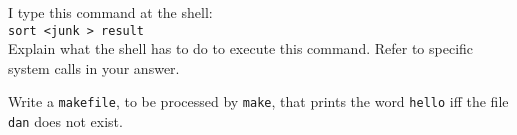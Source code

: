 

I type this command at the shell: \\
\verb|sort <junk > result| \\
Explain what the shell has to do to execute this command. Refer to specific system calls in your answer.

\vfill


Write a \verb|makefile|, to be processed by \verb|make|, that prints the word \verb|hello| iff the file \verb|dan| does not exist.

\vfill
